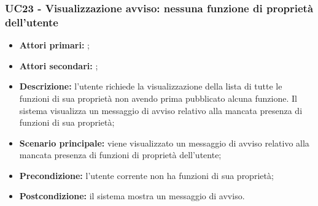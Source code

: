 \subsubsection{UC23 - Visualizzazione avviso: nessuna funzione di proprietà dell’utente}
\begin{itemize}
	\item \textbf{Attori primari:} \us{};
	\item \textbf{Attori secondari:} \re{};
	\item \textbf{Descrizione:} l’utente richiede la visualizzazione della lista di tutte le funzioni di sua proprietà non avendo prima pubblicato alcuna funzione. Il sistema visualizza un messaggio di avviso relativo alla mancata presenza di funzioni di sua proprietà;
	\item \textbf{Scenario principale:} viene visualizzato un messaggio di avviso relativo alla mancata presenza di funzioni di proprietà dell’utente;
	\item \textbf{Precondizione:} l’utente corrente non ha funzioni di sua proprietà;
	\item \textbf{Postcondizione:} il sistema mostra un messaggio di avviso.
\end{itemize}